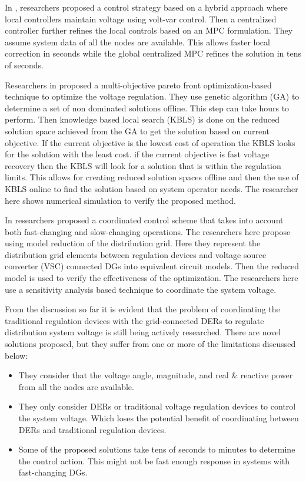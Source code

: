 \documentclass[Journal]{IEEEtran}
\begin{document}
In \cite{NLR_8}, researchers proposed a control strategy based on a hybrid approach where local controllers maintain voltage using volt-var control. Then a centralized controller further refines the local controls based on an MPC formulation. They assume system data of all the nodes are available. This allows faster local correction in seconds while the global centralized MPC refines the solution in tens of seconds.

Researchers in \cite{NLR_9} proposed a multi-objective pareto front optimization-based technique to optimize the voltage regulation. They use genetic algorithm (GA) to determine a set of non dominated solutions offline. This step can take hours to perform. Then knowledge based local search (KBLS) is done on the reduced solution space achieved from the GA to get the solution based on current objective. If the current objective is the lowest cost of operation the KBLS looks for the solution with the least cost. if the current objective is fast voltage recovery then the KBLS will look for a solution that is within the regulation limits. This allows for creating reduced solution spaces offline and then the use of KBLS online to find the solution based on system operator needs. The researcher here shows numerical simulation to verify the proposed method.

In \cite{NLR_10} researchers proposed a coordinated control scheme that takes into account both fast-changing and slow-changing operations. The researchers here propose using model reduction of the distribution grid. Here they represent the distribution grid elements between regulation devices and voltage source converter (VSC) connected DGs into equivalent circuit models. Then the reduced model is used to verify the effectiveness of the optimization. The researchers here use a sensitivity analysis based technique to coordinate the system voltage.

From the discussion so far it is evident that the problem of coordinating the traditional regulation devices with the grid-connected DERs to regulate distribution system voltage is still being actively researched. There are novel solutions proposed, but they suffer from one or more of the limitations discussed below:
\begin{itemize}
    \item They consider that the voltage angle, magnitude, and real \& reactive power from all the nodes are available.
    \item They only consider DERs or traditional voltage regulation devices to control the system voltage. Which loses the potential benefit of coordinating between DERs and traditional regulation devices.
    \item Some of the proposed solutions take tens of seconds to minutes to determine the control action. This might not be fast enough response in systems with fast-changing DGs.
\end{itemize}
\end{document}
